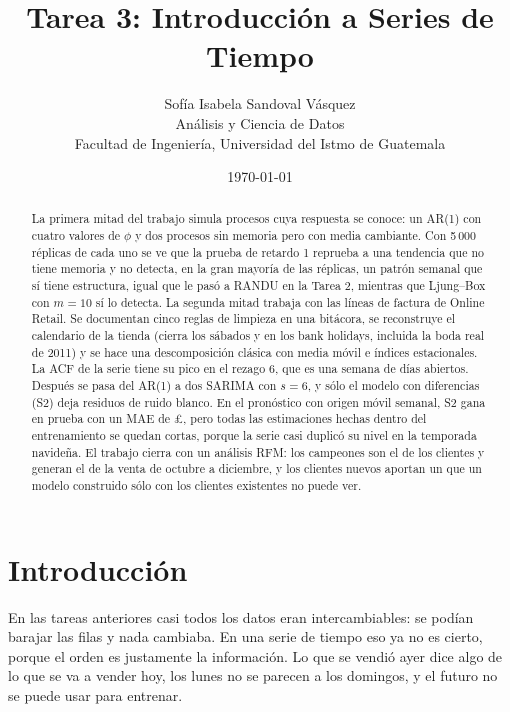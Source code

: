 \documentclass[11pt,letterpaper]{article}
\title{\textbf{Tarea 3: Introducción a Series de Tiempo}}
\author{Sofía Isabela Sandoval Vásquez\\
        Análisis y Ciencia de Datos\\
        Facultad de Ingeniería, Universidad del Istmo de Guatemala}
\date{\today}
\begin{document}
\maketitle

\begin{abstract}
\noindent
La primera mitad del trabajo simula procesos cuya respuesta se conoce: un
AR(1) con cuatro valores de $\phi$ y dos procesos sin memoria pero con media
cambiante. Con 5\,000 réplicas de cada uno se ve que la prueba de retardo 1
reprueba a una tendencia que no tiene memoria y no detecta, en la gran
mayoría de las réplicas, un patrón semanal que sí tiene estructura, igual que
le pasó a RANDU en la Tarea 2, mientras que Ljung--Box con $m=10$ sí lo
detecta. La segunda mitad trabaja con las
\FilasCrudas{} líneas de factura de Online Retail. Se documentan cinco reglas
de limpieza en una bitácora, se reconstruye el calendario de la tienda
(cierra los sábados y en los bank holidays, incluida la boda real de 2011) y
se hace una descomposición clásica con media móvil e índices estacionales. La
ACF de la serie tiene su pico en el rezago 6, que es una semana de días
abiertos. Después se pasa del AR(1) a dos SARIMA con $s=6$, y sólo el modelo
con diferencias (S2) deja residuos de ruido blanco. En el pronóstico con
origen móvil semanal, S2 gana en prueba con un MAE de \pounds\MAEcSdos{}, pero
todas las estimaciones hechas dentro del entrenamiento se quedan cortas,
porque la serie casi duplicó su nivel en la temporada navideña. El trabajo
cierra con un análisis RFM: los campeones son el \FracCampeones{} de los
clientes y generan el \VentaCampeones{} de la venta de octubre a diciembre,
y los clientes nuevos aportan un \VentaNuevos{} que un modelo construido
sólo con los clientes existentes no puede ver.
\end{abstract}

\newpage
\tableofcontents
\newpage

\section{Introducción}

En las tareas anteriores casi todos los datos eran intercambiables: se podían
barajar las filas y nada cambiaba. En una serie de tiempo eso ya no es cierto,
porque el orden es justamente la información. Lo que se vendió ayer dice algo
de lo que se va a vender hoy, los lunes no se parecen a los domingos, y el
futuro no se puede usar para entrenar.
\end{document}
